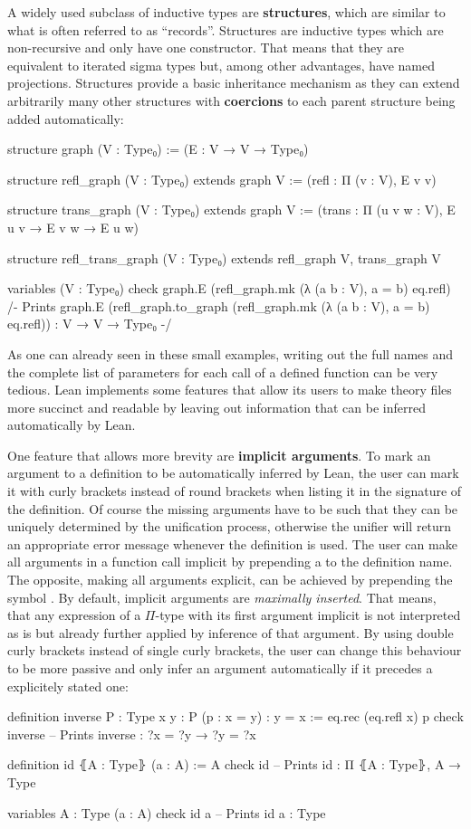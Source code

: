A widely used subclass of inductive types are \textbf{structures}, which are
similar to what is often referred to as ``records''.
Structures are inductive types which are non-recursive and only have one constructor.
That means that they are equivalent to iterated sigma types but, among other advantages,
have named projections.
Structures provide a basic inheritance mechanism as they can extend arbitrarily
many other structures with \textbf{coercions} to each parent structure being
added automatically:
\begin{leancode}
structure graph (V : Type₀) :=
  (E : V → V → Type₀)

structure refl_graph (V : Type₀) extends graph V :=
  (refl : Π (v : V), E v v)

structure trans_graph (V : Type₀) extends graph V :=
  (trans : Π (u v w : V), E u v → E v w → E u w)

structure refl_trans_graph (V : Type₀) extends refl_graph V, trans_graph V

variables (V : Type₀)
check graph.E (refl_graph.mk (λ (a b : V), a = b) eq.refl)
/- Prints
  graph.E (refl_graph.to_graph 
    (refl_graph.mk (λ (a b : V), a = b) eq.refl)) :
    V → V → Type₀ -/
\end{leancode}

As one can already seen in these small examples, writing out the full names and
the complete list of parameters for each call of a defined function can be very
tedious.
Lean implements some features that allow its users to make theory files more
succinct and readable by leaving out information that can be inferred automatically
by Lean.

One feature that allows more brevity are \textbf{implicit arguments}.
To mark an argument to a definition to be automatically inferred by Lean,
the user can mark it with curly brackets instead of round brackets when listing
it in the signature of the definition.
Of course the missing arguments have to be such that they can be uniquely determined
by the unification process, otherwise the unifier will return an appropriate error
message whenever the definition is used.
The user can make all arguments in a function call implicit by prepending a
\leani{!} to the definition name.
The opposite, making all arguments explicit, can be achieved by prepending the
symbol .
By default, implicit arguments are \emph{maximally inserted}.
That means, that any expression of a $\Pi$-type with its first argument implicit
is not interpreted as is but already further applied by inference of that argument.
By using double curly brackets  instead of single curly brackets,
the user can change this behaviour to be more passive and only infer an argument
automatically if it precedes a explicitely stated one:
\begin{leancode}
definition inverse {P : Type} {x y : P} (p : x = y) : y = x :=
  eq.rec (eq.refl x) p
check inverse -- Prints inverse : ?x = ?y → ?y = ?x

definition id ⦃A : Type⦄ (a : A) := A
check id -- Prints id : Π ⦃A : Type⦄, A → Type

variables {A : Type} (a : A)
check id a -- Prints id a : Type
\end{leancode}

